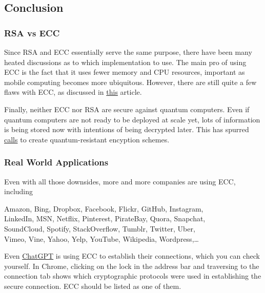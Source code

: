 \documentclass{article}
\begin{document}
\subsection*{Conclusion}

    \subsubsection*{RSA vs ECC}

    Since RSA and ECC essentially serve the same purpose, there have been many heated discussions as to which implementation to use. The main pro of using ECC is the fact that it uses fewer memory and CPU resources, important as mobile computing becomes more ubiquitous. However, there are still quite a few flaws with ECC, as discussed in \href{https://www.isaca.org/-/media/files/isacadp/project/isaca/articles/journal/2016/volume-3/can-elliptic-curve-cryptography-be-trusted_joa_eng_0516.pdf}{this} article.
    
    \vspace{2mm}
    Finally, neither ECC nor RSA are secure against quantum computers. Even if quantum computers are not ready to be deployed at scale yet, lots of information is being stored now with intentions of being decrypted later. This has spurred \href{https://csrc.nist.gov/projects/post-quantum-cryptography}{calls} to create quantum-resistant encyption schemes.

    \subsubsection*{Real World Applications}

    Even with all those downsides, more and more companies are using ECC, including

    \begin{center}
        Amazon, Bing, Dropbox, Facebook, Flickr, GitHub, Instagram, \\
        LinkedIn, MSN, Netflix, Pinterest, PirateBay, Quora, Snapchat, \\
        SoundCloud, Spotify, StackOverflow, Tumblr, Twitter, Uber, \\
        Vimeo, Vine, Yahoo, Yelp, YouTube, Wikipedia, Wordpress,\dots
    \end{center}
    Even \href{https://chat.openai.com/chat}{ChatGPT} is using ECC to establish their connections, which you can check yourself. In Chrome, clicking on the lock in the address bar and traversing to the connection tab shows which cryptographic protocols were used in establishing the secure connection. ECC should be listed as one of them.
\end{document}
